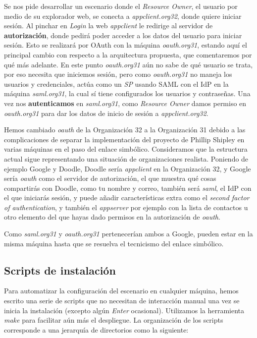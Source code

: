 \documentclass[]{article}
\begin{document}
Se nos pide desarrollar un escenario donde el \textit{Resource Owner}, el usuario por medio de su explorador web, se conecta a \textit{appclient.org32},
donde quiere iniciar sesión. Al pinchar en \textit{Login} la web \textit{appclient} le redirige al servidor de \textbf{autorización}, donde pedirá poder acceder
a los datos del usuario para iniciar sesión. Esto se realizará por OAuth con la máquina \textit{oauth.org31}, estando aquí el principal cambio con respecto
a la arquitectura propuesta, que comentaremos por qué más adelante. En este punto \textit{oauth.org31} aún no sabe de qué usuario se trata, por eso necesita que
iniciemos sesión, pero como \textit{oauth.org31} no maneja los usuarios y credenciales, actúa como un \textit{SP} usando SAML con el IdP en la máquina \textit{saml.org31},
la cual sí tiene configurados los usuarios y contraseñas. Una vez nos \textbf{autenticamos} en \textit{saml.org31}, como \textit{Resource Owner} damos permiso en
\textit{oauth.org31} para dar los datos de inicio de sesión a \textit{appclient.org32}.


\hfill

Hemos cambiado \textit{oauth} de la Organización 32 a la Organización 31 debido a las complicaciones de separar la implementación del proyecto de Phillip Shipley en varias máquinas
en el paso del enlace simbólico. Consideramos que la estructura actual sigue representando una situación de organizaciones realista. Poniendo de ejemplo Google y Doodle,
Doodle sería \textit{appclient} en la Organización 32, y Google sería \textit{oauth} como el servidor de autorización, el que muestra qué cosas compartirás con Doodle, como tu nombre y correo,
también será \textit{saml}, el IdP con el que iniciarás sesión, y puede añadir características extra como el \textit{second factor of authentication}, y también el \textit{appserver} por ejemplo
con la lista de contactos u otro elemento del que hayas dado permisos en la autorización de \textit{oauth}.

Como \textit{saml.org31} y \textit{oauth.org31} pertenecerían ambos a Google, pueden estar en la misma máquina hasta que se resuelva el tecnicismo del enlace simbólico.

\hfill

\subsection{Scripts de instalación}

Para automatizar la configuración del escenario en cualquier máquina, hemos escrito una serie de scripts que no necesitan de interacción manual una
vez se inicia la instalación (excepto algún \textit{Enter} ocasional). Utilizamos la herramienta \textit{make} para facilitar aún más
el despliegue. La organización de los scripts corresponde a una jerarquía de directorios como la siguiente:
\end{document}
